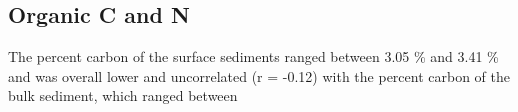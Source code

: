 \subsection{Organic C and N}

The percent carbon of the surface sediments ranged between 3.05 \% and 3.41 \% and was overall lower and uncorrelated (r = -0.12) with the percent carbon of the bulk sediment, which ranged between 
    
